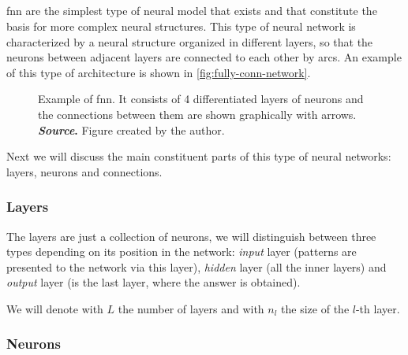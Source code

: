 \subsection{}\label{sec:fnn}

\Gls{fnn} are the simplest type of neural model that exists and that constitute
the basis for more complex neural structures. This type of neural network is
characterized by a neural structure organized in different layers, so that the
neurons between adjacent layers are connected to each other by arcs. An example
of this type of architecture is shown in \vref{fig:fully-conn-network}.

\begin{figure}[ht]
  \centering
  
  \caption[ topology]{Example of \acl{fnn}. It consists of 4
    differentiated layers of neurons and the connections between them are shown
    graphically with arrows. \textbf{\textsl{Source}.} Figure created by the
    author.}\label{fig:fully-conn-network}
\end{figure}

Next we will discuss the main constituent parts of this type of neural
networks: layers, neurons and connections.

\subsubsection{Layers}

The layers are just a collection of neurons, we will distinguish between three
types depending on its position in the network: \emph{input} layer (patterns
are presented to the network via this layer), \emph{hidden} layer (all the
inner layers) and \emph{output} layer (is the last layer, where the answer is
obtained).

We will denote with \(L\) the number of layers and with \(n_l\) the size of the
\(l\)-th layer.

\subsubsection{Neurons}

